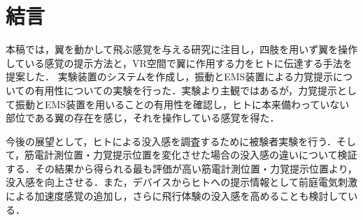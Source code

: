 

  \section{結言}
  本稿では，翼を動かして飛ぶ感覚を与える研究に注目し，四肢を用いず翼を操作している感覚の提示方法と，VR空間で翼に作用する力をヒトに伝達する手法を提案した．
  実験装置のシステムを作成し，振動とEMS装置による力覚提示についての有用性についての実験を行った．実験より主観ではあるが，力覚提示として振動とEMS装置を用いることの有用性を確認し，ヒトに本来備わっていない部位である翼の存在を感じ，それを操作している感覚を得た．

  今後の展望として，ヒトによる没入感を調査するために被験者実験を行う．そして，筋電計測位置・力覚提示位置を変化させた場合の没入感の違いについて検証する．その結果から得られる最も評価が高い筋電計測位置・力覚提示位置より，没入感を向上させる．また，デバイスからヒトへの提示情報として前庭電気刺激による加速度感覚\cite{maeda2005shaking}\cite{青山一真2014前庭電気刺激における逆方向不感電流を用いた加速度感覚の増強}の追加し，さらに飛行体験の没入感を高めることも検討している．



   
        

